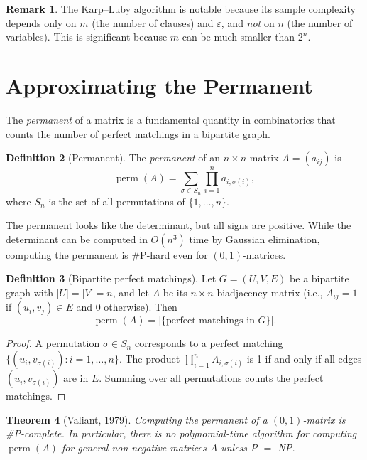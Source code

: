 \documentclass[twoside,12pt]{book}
\theoremstyle{plain}
\newtheorem{theorem}{Theorem}[chapter]
\theoremstyle{definition}
\newtheorem{definition}[theorem]{Definition}
\newtheorem{remark}[theorem]{Remark}
\theoremstyle{remark}
\begin{document}
\begin{remark}
The Karp--Luby algorithm is notable because its sample complexity depends only on $m$ (the number of clauses) and $\varepsilon$, and \emph{not} on $n$ (the number of variables). This is significant because $m$ can be much smaller than $2^n$.
\end{remark}

\section{Approximating the Permanent}
\label{sec:permanent}

The \emph{permanent} of a matrix is a fundamental quantity in combinatorics that counts the number of perfect matchings in a bipartite graph.

\begin{definition}[Permanent]
The \emph{permanent} of an $n \times n$ matrix $A = (a_{ij})$ is
\[
\operatorname{perm}(A) = \sum_{\sigma \in S_n} \prod_{i=1}^n a_{i,\sigma(i)},
\]
where $S_n$ is the set of all permutations of $\{1, \ldots, n\}$.
\end{definition}

The permanent looks like the determinant, but all signs are positive. While the determinant can be computed in $O(n^3)$ time by Gaussian elimination, computing the permanent is \#P-hard even for $(0,1)$-matrices.

\begin{definition}[Bipartite perfect matchings]
Let $G = (U, V, E)$ be a bipartite graph with $|U| = |V| = n$, and let $A$ be its $n \times n$ biadjacency matrix (i.e., $A_{ij} = 1$ if $(u_i, v_j) \in E$ and 0 otherwise). Then
\[
\operatorname{perm}(A) = |\{\text{perfect matchings in } G\}|.
\]
\end{definition}

\begin{proof}
A permutation $\sigma \in S_n$ corresponds to a perfect matching $\{(u_i, v_{\sigma(i)}) : i = 1, \ldots, n\}$. The product $\prod_{i=1}^n A_{i,\sigma(i)}$ is 1 if and only if all edges $(u_i, v_{\sigma(i)})$ are in $E$. Summing over all permutations counts the perfect matchings.
\end{proof}

\begin{theorem}[Valiant, 1979]
\label{thm:valiant}
Computing the permanent of a $(0,1)$-matrix is \#P-complete. In particular, there is no polynomial-time algorithm for computing $\operatorname{perm}(A)$ for general non-negative matrices $A$ unless P $=$ NP.
\end{theorem}
\end{document}
